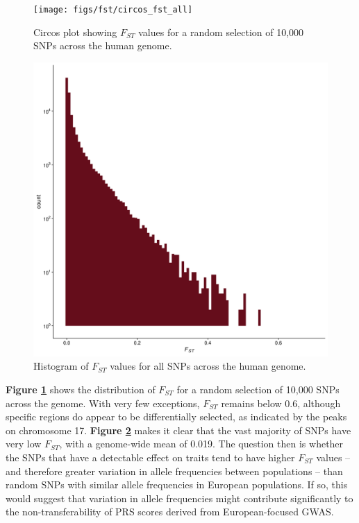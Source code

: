 \documentclass[
]{book}
\begin{document}
\begin{figure}
\texttt{[image: figs/fst/circos\_fst\_all]} \caption{Circos plot showing \(F_{ST}\) values for a random selection of 10,000 SNPs across the human genome.}\label{fig:fst-circos}
\end{figure}



\begin{figure}

{\centering \includegraphics[width=0.8\linewidth]{figs/fst/histo_fst_all} 

}

\caption{Histogram of \(F_{ST}\) values for all SNPs across the human genome.}\label{fig:fst-histo}
\end{figure}

\textbf{Figure \ref{fig:fst-circos}} shows the distribution of \(F_{ST}\) for a random selection of 10,000 SNPs across the genome. With very few exceptions, \(F_{ST}\) remains below 0.6, although specific regions do appear to be differentially selected, as indicated by the peaks on chromosome 17. \textbf{Figure \ref{fig:fst-histo}} makes it clear that the vast majority of SNPs have very low \(F_{ST}\), with a genome-wide mean of 0.019. The question then is whether the SNPs that have a detectable effect on traits tend to have higher \(F_{ST}\) values -- and therefore greater variation in allele frequencies between populations -- than random SNPs with similar allele frequencies in European populations. If so, this would suggest that variation in allele frequencies might contribute significantly to the non-transferability of PRS scores derived from European-focused GWAS.
\end{document}
